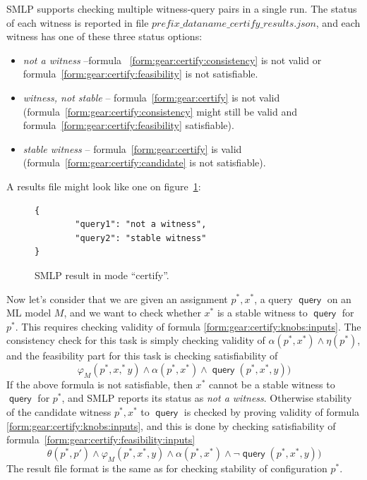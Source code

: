 \documentclass[a4paper,parskip=half]{article} %
\newcommand*\query{\operatorname{\mathsf{query}}}
\begin{document}
SMLP supports checking multiple witness-query pairs in a single run. The status of each witness is reported in file 
 $prefix\_dataname\_certify\_results.json$, and each witness has one of these three status options:   
\begin{itemize}
\item \emph{not a witness} --formula ~\cref{form:gear:certify:consistency} is not valid or formula~\cref{form:gear:certify:feasibility} is not satisfiable.  
\item \emph{witness, not stable} -- formula~\cref{form:gear:certify} is not valid 
(formula~\cref{form:gear:certify:consistency} might still be valid and  formula~\cref{form:gear:certify:feasibility} satisfiable).
\item \emph{stable witness} -- formula~\cref{form:gear:certify} is valid (formula~\cref{form:gear:certify:candidate} is not satisfiable).
\end{itemize}

A results file might look like one on figure~\cref{fig:certify:result}:

\begin{figure}
\small
\begin{verbatim}
{
        "query1": "not a witness",
        "query2": "stable witness"
}
\end{verbatim}
\caption{SMLP result in mode ``certify''.}
\label{fig:certify:result}
\end{figure}


Now let's consider that we are given an assignment $p^*,x^*$,  a query $\query$ on an 
ML model $M$, and we want to check whether $x^*$ is a stable witness to $\query$ for $p^*$.
This requires checking validity of  formula	\cref{form:gear:certify:knobs:inputs}. The consistency check for this task 
is simply checking validity of $\alpha(p^*, x^*) \wedge \eta(p^*)$, and the feasibility part for this task is checking 
satisfiability of 
\begin{equation}\label{form:gear:certify:feasibility:inputs}
       \varphi_M(p^*,x,^*y)  \wedge  \alpha(p^*,x^*) \wedge   \query(p^*,x^*,y))
\end{equation}
If the above formula is not satisfiable, then $x^*$ cannot be a stable witness to $\query$ for $p^*$, 
and SMLP reports its status as \emph{not a witness}. 
Otherwise stability of the candidate witness $p^*, x^*$ to $\query$ is checked by proving validity of 
formula \cref{form:gear:certify:knobs:inputs},
and this is done by checking satisfiability of formula~\cref{form:gear:certify:feasibility:inputs}
\begin{equation}\label{form:gear:certify:feasibility:inputs} %
     \theta(p^*, p')  \wedge  \varphi_M(p^*,x^*,y)  \wedge  \alpha(p^*,x^*) \wedge   \neg \query(p^*,x^*,y))
\end{equation}
The result file format is the same as for checking stability of configuration $p^*$.
\end{document}
